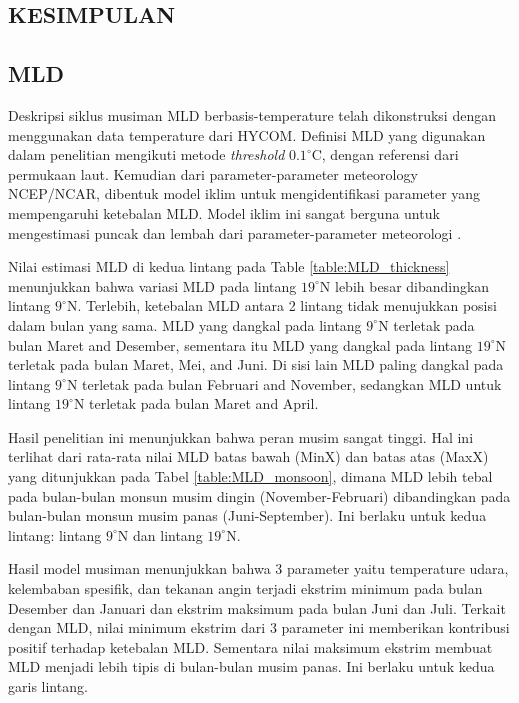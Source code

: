 \vspace{1.5pc}
\begin{spacing}{1.5}
\section[Kesimpulan]{KESIMPULAN}
\subsection[MLD]{MLD}

	Deskripsi siklus musiman MLD berbasis-temperature telah dikonstruksi dengan menggunakan data temperature dari HYCOM. Definisi MLD yang digunakan dalam penelitian mengikuti metode \textit{threshold} $0.1^\circ$C, dengan referensi dari permukaan laut. Kemudian dari parameter-parameter meteorology NCEP/NCAR, dibentuk model iklim untuk mengidentifikasi parameter yang mempengaruhi ketebalan MLD. Model iklim ini sangat berguna untuk mengestimasi puncak dan lembah dari parameter-parameter meteorologi . 
	
	Nilai estimasi MLD di kedua lintang pada Table \ref{table:MLD_thickness} menunjukkan bahwa variasi MLD pada lintang $19^\circ$N lebih besar dibandingkan lintang $9^\circ$N. Terlebih, ketebalan MLD antara 2 lintang tidak menujukkan posisi dalam bulan yang sama. MLD yang dangkal pada lintang $9^\circ$N terletak pada bulan Maret and Desember, sementara itu MLD yang dangkal pada lintang $19^\circ$N terletak pada bulan Maret, Mei, and Juni. Di sisi lain MLD paling dangkal pada lintang $9^\circ$N terletak pada bulan Februari and November, sedangkan MLD untuk lintang $19^\circ$N terletak pada bulan Maret and April.
	
	Hasil penelitian ini menunjukkan bahwa peran musim sangat tinggi. Hal ini terlihat dari rata-rata nilai MLD batas bawah (MinX) dan batas atas (MaxX) yang ditunjukkan pada Tabel \ref{table:MLD_monsoon}, dimana MLD lebih tebal pada bulan-bulan monsun musim dingin (November-Februari) dibandingkan pada bulan-bulan monsun musim panas (Juni-September). Ini berlaku untuk kedua lintang: lintang $9^\circ$N dan lintang $19^\circ$N.
	
	Hasil model musiman menunjukkan bahwa 3 parameter yaitu temperature udara, kelembaban spesifik, dan tekanan angin terjadi ekstrim minimum pada bulan Desember dan Januari dan ekstrim maksimum pada bulan Juni dan Juli. Terkait dengan MLD, nilai minimum ekstrim dari 3 parameter ini memberikan kontribusi positif terhadap ketebalan MLD. Sementara nilai maksimum ekstrim membuat MLD menjadi lebih tipis di bulan-bulan musim panas. Ini berlaku untuk kedua garis lintang.
	

\end{spacing}
